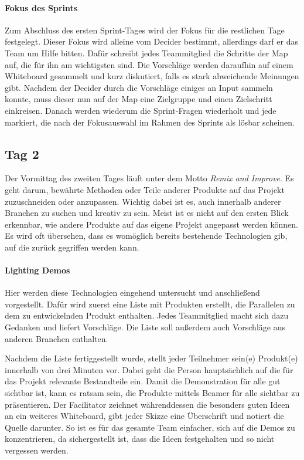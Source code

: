 \paragraph{Fokus des Sprints}
Zum Abschluss des ersten Sprint-Tages wird der Fokus für die restlichen Tage festgelegt. Dieser Fokus wird alleine vom Decider bestimmt, allerdings darf er das Team um Hilfe bitten. Dafür schreibt jedes Teammitglied die Schritte der Map auf, die für ihn am wichtigsten sind. Die Vorschläge werden daraufhin auf einem Whiteboard gesammelt und kurz diskutiert, falls es stark abweichende Meinungen gibt. Nachdem der Decider durch die Vorschläge einiges an Input sammeln konnte, muss dieser nun auf der Map eine Zielgruppe und einen Zielschritt einkreisen. Danach werden wiederum die Sprint-Fragen wiederholt und jede markiert, die nach der Fokusauswahl im Rahmen des Sprints als lösbar scheinen.

\subsection*{\label{sec:Sprint-Tag2}\thesubsection\quad Tag 2}
Der Vormittag des zweiten Tages läuft unter dem Motto \textit{Remix and Improve}. Es geht darum, bewährte Methoden oder Teile anderer Produkte auf das Projekt zuzuschneiden oder anzupassen. Wichtig dabei ist es, auch innerhalb anderer Branchen zu suchen und kreativ zu sein. Meist ist es nicht auf den ersten Blick erkennbar, wie andere Produkte auf das eigene Projekt angepasst werden können. Es wird oft übersehen, dass es womöglich bereits bestehende Technologien gib, auf die zurück gegriffen werden kann.

\paragraph{Lighting Demos}
Hier werden diese Technologien eingehend untersucht und anschließend vorgestellt. Dafür wird zuerst eine Liste mit Produkten erstellt, die Parallelen zu dem zu entwickelnden Produkt enthalten. Jedes Teammitglied macht sich dazu Gedanken und liefert Vorschläge. Die Liste soll außerdem auch Vorschläge aus anderen Branchen enthalten.

Nachdem die Liste fertiggestellt wurde, stellt jeder Teilnehmer sein(e) Produkt(e) innerhalb von drei Minuten vor. Dabei geht die Person hauptsächlich auf die für das Projekt relevante Bestandteile ein. Damit die Demonstration für alle gut sichtbar ist, kann es ratsam sein, die Produkte mittels Beamer für alle sichtbar zu präsentieren. Der Facilitator zeichnet währenddessen die besonders guten Ideen an ein weiteres Whiteboard, gibt jeder Skizze eine Überschrift und notiert die Quelle darunter. So ist es für das gesamte Team einfacher, sich auf die Demos zu konzentrieren, da sichergestellt ist, dass die Ideen festgehalten und so nicht vergessen werden.

